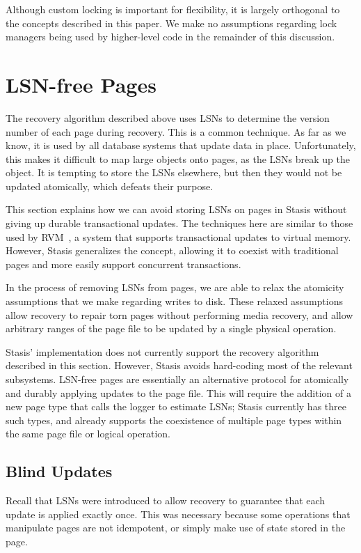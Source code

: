 \documentclass[letterpaper,twocolumn,10pt]{article}
\newcommand{\yad}{Stasis\xspace}
\newcommand{\yads}{Stasis'\xspace}
\begin{document}
Although custom locking is important for flexibility, it is largely
orthogonal to the concepts described in this paper.  We make no
assumptions regarding lock managers being used by higher-level code in
the remainder of this discussion.

\section{LSN-free Pages}
\label{sec:lsn-free}

The recovery algorithm described above uses LSNs to determine the
version number of each page during recovery.  This is a common
technique.  As far as we know, it is used by all database systems that
update data in place.  Unfortunately, this makes it difficult to map
large objects onto pages, as the LSNs break up the object.  It
is tempting to store the LSNs elsewhere, but then they would not be
updated atomically, which defeats their purpose.

This section explains how we can avoid storing LSNs on pages in \yad
without giving up durable transactional updates.  The techniques here
are similar to those used by RVM~\cite{lrvm}, a system that supports
transactional updates to virtual memory.  However, \yad generalizes
the concept, allowing it to coexist with traditional pages and more easily
support concurrent transactions.

In the process of removing LSNs from pages, we
are able to relax the atomicity assumptions that we make regarding
writes to disk.  These relaxed assumptions allow recovery to repair
torn pages without performing media recovery, and allow arbitrary
ranges of the page file to be updated by a single physical operation.

\yads implementation does not currently support the recovery algorithm
described in this section.  However, \yad avoids hard-coding most of
the relevant subsystems.  LSN-free pages are essentially an
alternative protocol for atomically and durably applying updates to
the page file.  This will require the addition of a new page type that
calls the logger to estimate LSNs; \yad currently has three such
types, and already supports the
coexistence of multiple page types within the same page file or
logical operation.

\subsection{Blind Updates}

Recall that LSNs were introduced to allow recovery to guarantee that
each update is applied exactly once.  This was necessary because some
operations that manipulate pages are not idempotent, or simply make
use of state stored in the page.
\end{document}
